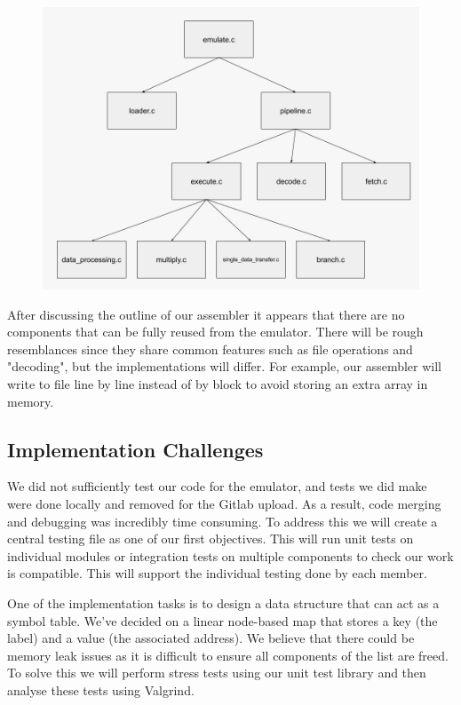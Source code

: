 \documentclass[10pt]{article}
\begin{document}
 \begin{figure}[h]
 \includegraphics[scale=0.3]{emulator_structure}
 \centering
 \end{figure}

After discussing the outline of our assembler it appears that there are no components that can be fully reused from the emulator. There will be rough resemblances since they share common features such as file operations and "decoding", but the implementations will differ. For example, our assembler will write to file line by line instead of by block to avoid storing an extra array in memory.

\subsection*{Implementation Challenges}

We did not sufficiently test our code for the emulator, and tests we did make were done locally and removed for the Gitlab upload. As a result, code merging and debugging was incredibly time consuming. To address this we will create a central testing file as one of our first objectives. This will run unit tests on individual modules or integration tests on multiple components to check our work is compatible. This will support the individual testing done by each member.

One of the implementation tasks is to design a data structure that can act as a symbol table. We’ve decided on a linear node-based map that stores a key (the label) and a value (the associated address). We believe that there could be memory leak issues as it is difficult to ensure all components of the list are freed. To solve this we will perform stress tests using our unit test library and then analyse these tests using Valgrind.

  
\end{document}
